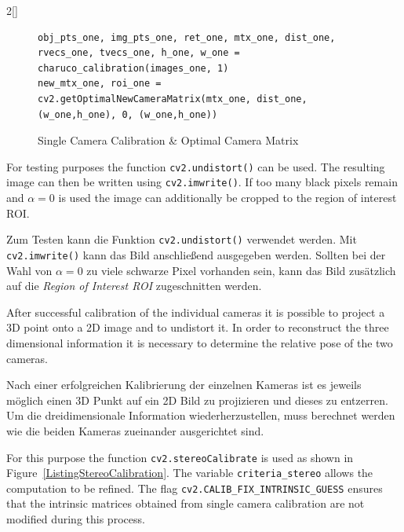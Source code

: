 \begin{paracol}{2}[]
\begin{figure}
\begin{lstlisting}[style=shell]
obj_pts_one, img_pts_one, ret_one, mtx_one, dist_one, rvecs_one, tvecs_one, h_one, w_one = charuco_calibration(images_one, 1)
new_mtx_one, roi_one = cv2.getOptimalNewCameraMatrix(mtx_one, dist_one, (w_one,h_one), 0, (w_one,h_one))
	\end{lstlisting}
	\caption{Single Camera Calibration \& Optimal Camera Matrix}
	\label{ListingCameraCalibration}
\end{figure}
\FloatBarrier

\colstart

For testing purposes the function \texttt{cv2.undistort()} can be used. The resulting image can then be written using \texttt{cv2.imwrite()}. If too many black pixels remain and $\alpha = 0$ is used the image can additionally be cropped to the region of interest ROI.

\colger

Zum Testen kann die Funktion \texttt{cv2.undistort()} verwendet werden. Mit \texttt{cv2.imwrite()} kann das Bild anschließend ausgegeben werden. Sollten bei der Wahl von $\alpha = 0$ zu viele schwarze Pixel vorhanden sein, kann das Bild zusätzlich auf die \textsl{Region of Interest ROI} zugeschnitten werden.

\colende

\renewcommand{\deutschertitel}{Stereo-Kalibrierung}
\renewcommand{\englischertitel}{Stereo Calibration}
\makroabschnitt
\label{AbschnittStereoKalibrierung}

After successful calibration of the individual cameras it is possible to project a 3D point onto a 2D image and to undistort it. In order to reconstruct the three dimensional information it is necessary to determine the relative pose of the two cameras.

\colger

Nach einer erfolgreichen Kalibrierung der einzelnen Kameras ist es jeweils möglich einen 3D Punkt auf ein 2D Bild zu projizieren und dieses zu entzerren. Um die dreidimensionale Information wiederherzustellen, muss berechnet werden wie die beiden Kameras zueinander ausgerichtet sind.

\coleng

For this purpose the function \texttt{cv2.stereoCalibrate} is used as shown in Figure~\ref{ListingStereoCalibration}. The variable \texttt{criteria\_stereo} allows the computation to be refined. The flag \texttt{cv2.CALIB\_FIX\_INTRINSIC\_GUESS} ensures that the intrinsic matrices obtained from single camera calibration are not modified during this process.


\end{paracol}

